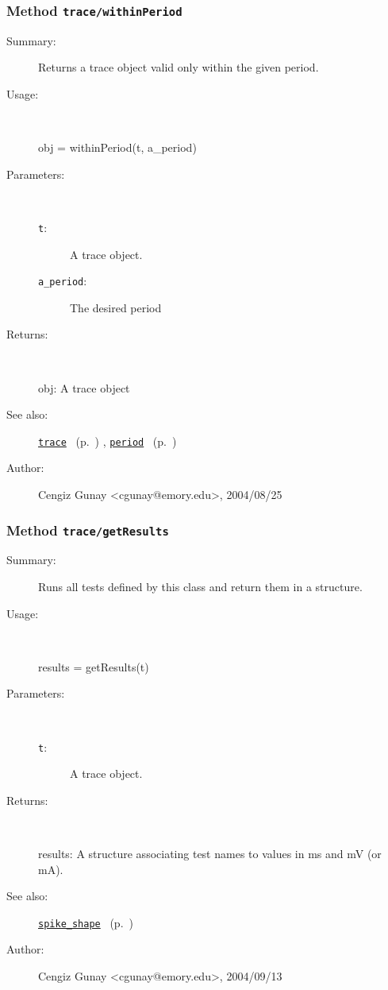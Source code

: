 \subsubsection[Method \texttt{withinPeriod}]{Method \texttt{trace/withinPeriod}}%
%
\label{ref_trace__withinPeriod}%
\hypertarget{ref_trace__withinPeriod}{}%
\begin{description}
\item[Summary:]Returns a trace object valid only within the given period.
%
\item[Usage:]~%
\begin{lyxcode}%
obj = withinPeriod(t, a\_period)
%
\end{lyxcode}%
%
%
\item[Parameters:]~
\begin{description}%
\item[\texttt{t}:]
 A trace object.
\item[\texttt{a\_period}:]
 The desired period
\end{description}%
%
\item[Returns:]~

	obj: A trace object
%
%
\item[See also:]%
\hyperlink{ref_trace}{\texttt{trace}}%
\ (p.~\pageref{ref_trace})%
%
, \hyperlink{ref_period}{\texttt{period}}%
\ (p.~\pageref{ref_period})%
%
%
\item[Author:]%
Cengiz Gunay <cgunay@emory.edu>, 2004/08/25%
\end{description}
\methodline%
\subsubsection[Method \texttt{getResults}]{Method \texttt{trace/getResults}}%
%
\label{ref_trace__getResults}%
\hypertarget{ref_trace__getResults}{}%
\begin{description}
\item[Summary:]Runs all tests defined by this class and return them in a 
		structure.
%
\item[Usage:]~%
\begin{lyxcode}%
results = getResults(t)
%
\end{lyxcode}%
%
%
\item[Parameters:]~
\begin{description}%
\item[\texttt{t}:]
 A trace object.
\end{description}%
%
\item[Returns:]~

	results: A structure associating test names to values 
		in ms and mV (or mA).
%
%
\item[See also:]%
\hyperlink{ref_spike_shape}{\texttt{spike\_shape}}%
\ (p.~\pageref{ref_spike_shape})%
%
%
\item[Author:]%
Cengiz Gunay <cgunay@emory.edu>, 2004/09/13%
\end{description}
\methodline%
